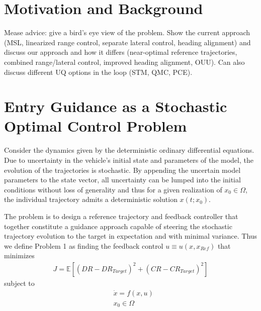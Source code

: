 \documentclass[10pt,a4paper]{article}
\begin{document}
	\section{Motivation and Background}
	Mease advice: give a bird's eye view of the problem. Show the current approach (MSL, linearized range control, separate lateral control, heading alignment) and discuss our approach and how it differs (near-optimal reference trajectories, combined range/lateral control, improved heading alignment, OUU). Can also discuss different UQ options in the loop (STM, QMC, PCE). 
		
		
	\section{Entry Guidance as a Stochastic Optimal Control Problem}
	Consider the dynamics given by the deterministic ordinary differential equations. Due to uncertainty in the vehicle's initial state and parameters of the model, the evolution of the trajectories is stochastic. By appending the uncertain model parameters to the state vector, all uncertainty can be lumped into the initial conditions without loss of generality and thus for a given realization of $x_0\in\Omega$, the individual trajectory admits a deterministic solution $ x(t;x_0) $. 
	
	The problem is to design a reference trajectory and feedback controller that together constitute a guidance approach capable of steering the stochastic trajectory evolution to the target in expectation and with minimal variance. Thus we define Problem 1 as finding the feedback control $u\equiv u(x,x_{Ref})$ that minimizes
	\begin{align}
		J = \mathbb{E}[(DR-DR_{Target})^2 + (CR-CR_{Target})^2]
	\end{align}
	subject to 
	\begin{align}
		&\dot{x} = f(x,u) \\
		&x_0 \in \Omega
	\end{align}
	
\end{document}
